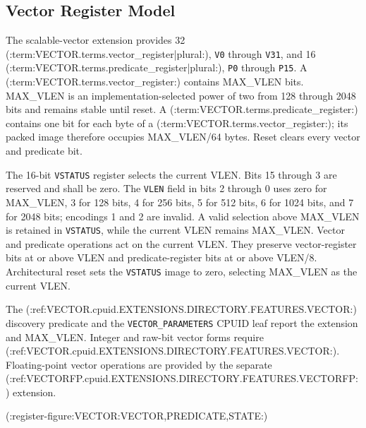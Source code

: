 \subsection{Vector Register Model}\label{section:vector-register-model}
The scalable-vector extension provides 32 (:term:VECTOR.terms.vector_register|plural:), \texttt{V0}
through \texttt{V31}, and 16 (:term:VECTOR.terms.predicate_register|plural:), \texttt{P0} through
\texttt{P15}. A (:term:VECTOR.terms.vector_register:) contains MAX\_VLEN bits.
MAX\_VLEN is an implementation-selected power of two from 128 through 2048
bits and remains stable until reset. A (:term:VECTOR.terms.predicate_register:)
contains one bit for each byte of a (:term:VECTOR.terms.vector_register:); its
packed image therefore occupies MAX\_VLEN/64 bytes. Reset clears every vector
and predicate bit.

The 16-bit \texttt{VSTATUS} register selects the current VLEN. Bits 15 through
3 are reserved and shall be zero. The \texttt{VLEN} field in bits 2 through 0
uses zero for MAX\_VLEN, 3 for 128 bits, 4 for 256 bits, 5 for 512 bits, 6 for
1024 bits, and 7 for 2048 bits; encodings 1 and 2 are invalid. A valid
selection above MAX\_VLEN is retained in \texttt{VSTATUS}, while the current
VLEN remains MAX\_VLEN. Vector and predicate operations act on the current
VLEN. They preserve vector-register bits at or above VLEN and
predicate-register bits at or above VLEN/8.
Architectural reset sets the \texttt{VSTATUS} image to zero, selecting
MAX\_VLEN as the current VLEN.

The (:ref:VECTOR.cpuid.EXTENSIONS.DIRECTORY.FEATURES.VECTOR:) discovery predicate and the \texttt{VECTOR\_PARAMETERS}
CPUID leaf report the extension and MAX\_VLEN. Integer and raw-bit vector forms
require (:ref:VECTOR.cpuid.EXTENSIONS.DIRECTORY.FEATURES.VECTOR:). Floating-point vector operations are provided by the
separate (:ref:VECTORFP.cpuid.EXTENSIONS.DIRECTORY.FEATURES.VECTORFP:) extension.

(:register-figure:VECTOR:VECTOR,PREDICATE,STATE:)
